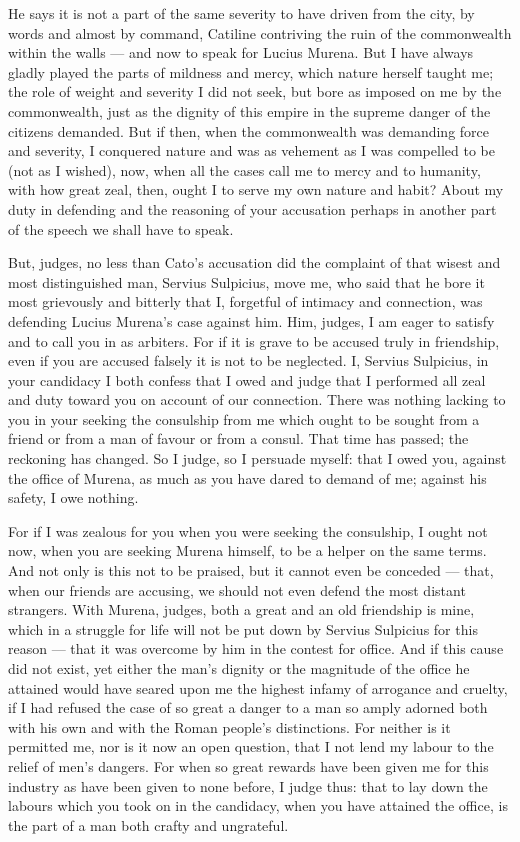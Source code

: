  He says it is not a part of the same severity to have driven from the city, by words and almost by command, Catiline contriving the ruin of the commonwealth within the walls --- and now to speak for Lucius Murena. But I have always gladly played the parts of mildness and mercy, which nature herself taught me; the role of weight and severity I did not seek, but bore as imposed on me by the commonwealth, just as the dignity of this empire in the supreme danger of the citizens demanded. But if then, when the commonwealth was demanding force and severity, I conquered nature and was as vehement as I was compelled to be (not as I wished), now, when all the cases call me to mercy and to humanity, with how great zeal, then, ought I to serve my own nature and habit? About my duty in defending and the reasoning of your accusation perhaps in another part of the speech we shall have to speak.

 But, judges, no less than Cato's accusation did the complaint of that wisest and most distinguished man, Servius Sulpicius, move me, who said that he bore it most grievously and bitterly that I, forgetful of intimacy and connection, was defending Lucius Murena's case against him. Him, judges, I am eager to satisfy and to call you in as arbiters. For if it is grave to be accused truly in friendship, even if you are accused falsely it is not to be neglected. I, Servius Sulpicius, in your candidacy I both confess that I owed and judge that I performed all zeal and duty toward you on account of our connection. There was nothing lacking to you in your seeking the consulship from me which ought to be sought from a friend or from a man of favour or from a consul. That time has passed; the reckoning has changed. So I judge, so I persuade myself: that I owed you, against the office of Murena, as much as you have dared to demand of me; against his safety, I owe nothing.

 For if I was zealous for you when you were seeking the consulship, I ought not now, when you are seeking Murena himself, to be a helper on the same terms. And not only is this not to be praised, but it cannot even be conceded --- that, when our friends are accusing, we should not even defend the most distant strangers. With Murena, judges, both a great and an old friendship is mine, which in a struggle for life will not be put down by Servius Sulpicius for this reason --- that it was overcome by him in the contest for office. And if this cause did not exist, yet either the man's dignity or the magnitude of the office he attained would have seared upon me the highest infamy of arrogance and cruelty, if I had refused the case of so great a danger to a man so amply adorned both with his own and with the Roman people's distinctions. For neither is it permitted me, nor is it now an open question, that I not lend my labour to the relief of men's dangers. For when so great rewards have been given me for this industry as have been given to none before, I judge thus: that to lay down the labours which you took on in the candidacy, when you have attained the office, is the part of a man both crafty and ungrateful.

